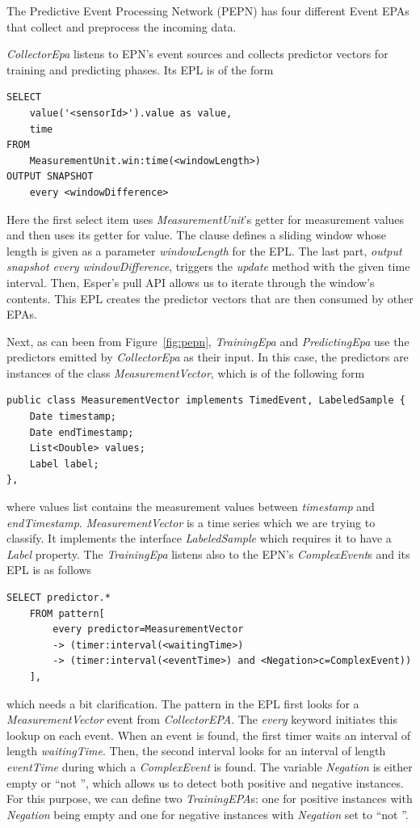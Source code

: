 The Predictive Event Processing Network (PEPN) has four different Event EPAs that collect and preprocess the incoming data. 

\emph{CollectorEpa} listens to EPN's event sources and collects predictor vectors for training and predicting phases. Its EPL is of the form
\begin{Verbatim}[xleftmargin=1.5em]
SELECT 
	value('<sensorId>').value as value, 
	time 
FROM 
	MeasurementUnit.win:time(<windowLength>)
OUTPUT SNAPSHOT
	every <windowDifference>
\end{Verbatim} 

Here the first select item uses \emph{MeasurementUnit}'s getter for measurement values and then uses its getter for value. The clause defines a sliding window whose length is given as a parameter \emph{windowLength} for the EPL. The last part, \emph{output snapshot every windowDifference}, triggers the \emph{update} method with the given time interval. Then, Esper's pull API allows us to iterate through the window's contents. \cite{EsperReference} This EPL creates the predictor vectors that are then consumed by other EPAs.

Next, as can been from Figure~\ref{fig:pepn}, \emph{TrainingEpa} and \emph{PredictingEpa} use the predictors emitted by \emph{CollectorEpa} as their input. In this case, the predictors are instances of the class \emph{MeasurementVector}, which is of the following form
\begin{Verbatim}[xleftmargin=1.5em]
public class MeasurementVector implements TimedEvent, LabeledSample {
	Date timestamp;
	Date endTimestamp;
	List<Double> values;
	Label label;
},
\end{Verbatim}
where values list contains the measurement values between \emph{timestamp} and \emph{endTimestamp}. \emph{MeasurementVector} is a time series which we are trying to classify. It implements the interface \emph{LabeledSample} which requires it to have a \emph{Label} property. The \emph{TrainingEpa} listens also to the EPN's \emph{ComplexEvent}s and its EPL is as follows
\begin{Verbatim}[xleftmargin=1.5em]
SELECT predictor.*
	FROM pattern[
		every predictor=MeasurementVector 
		-> (timer:interval(<waitingTime>) 
		-> (timer:interval(<eventTime>) and <Negation>c=ComplexEvent))
	],
\end{Verbatim} 
which needs a bit clarification. The pattern in the EPL first looks for a \emph{MeasurementVector} event from \emph{CollectorEPA}. The \emph{every} keyword initiates this lookup on each event. When an event is found, the first timer waits an interval of length \emph{waitingTime}. Then, the second interval looks for an interval of length \emph{eventTime} during which a \emph{ComplexEvent} is found. The variable \emph{Negation} is either empty or ``not '', which allows us to detect both positive and negative instances. For this purpose, we can define two \emph{TrainingEPA}s: one for positive instances with \emph{Negation} being empty and one for negative instances with \emph{Negation} set to ``not ''.

